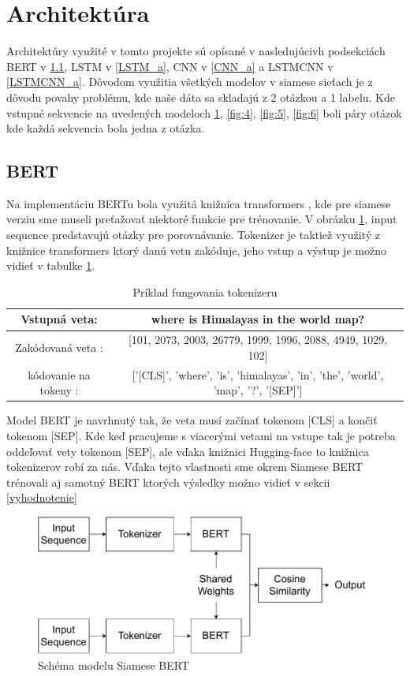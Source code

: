 \documentclass[a4paper, 16pt]{article}
\begin{document}
\section{Architektúra}
\label{architektura}

Architektúry využité v tomto projekte sú opísané v nasledujúcivh podsekciách BERT v \ref{BERT_a}, LSTM v \ref{LSTM_a}, CNN v \ref{CNN_a} a LSTMCNN v \ref{LSTMCNN_a}. Dôvodom využitia všetkých modelov v siamese sieťach je z dôvodu povahy problému, kde naše dáta sa skladajú z 2 otázkou a 1 labelu. Kde vstupné sekvencie na uvedených modeloch \ref{fig:3}, \ref{fig:4}, \ref{fig:5}, \ref{fig:6} boli páry otázok kde každá sekvencia bola jedna z otázka.

\subsection{BERT}
\label{BERT_a}
Na implementáciu BERTu bola využitá knižnica transformers \cite{transformers}, kde pre siamese verziu sme museli preťažovať niektoré funkcie pre trénovanie. V obrázku \ref{fig:3}, input sequence predstavujú otázky pre porovnávanie. Tokenizer je taktiež využitý z knižnice transformers ktorý danú vetu zakóduje, jeho vstup a výstup je možno vidieť v tabulke \ref{table:tokenizer}.

\begin{table}[H]
\centering
\begin{tabular}{ |c|c| } \hline
Vstupná veta: & where is Himalayas in the world map?\\ \hline
Zakódovaná veta : & [101, 2073, 2003, 26779, 1999, 1996, 2088, 4949, 1029, 102]\\ \hline
kódovanie na tokeny : & ['[CLS]', 'where', 'is', 'himalayas', 'in', 'the', 'world', 'map', '?', '[SEP]']\\ \hline
\end{tabular}
\caption{Príklad fungovania tokenizeru}
\label{table:tokenizer}
\end{table}

Model BERT je navrhnutý tak, že veta musí začínať tokenom [CLS] a končiť tokenom [SEP]. Kde keď pracujeme s viacerými vetami na vstupe tak je potreba oddeľovať vety tokenom [SEP], ale vďaka knižnici Hugging-face to knižnica tokenizerov robí za nás.
Vďaka tejto vlastnosti sme okrem Siamese BERT trénovali aj samotný BERT ktorých výsledky možno vidieť v sekcii \ref{vyhodnotenie}

\begin{figure}[H]
    \centering
    \includegraphics[width=15cm]{BERT.pdf}
    \caption{Schéma modelu Siamese BERT}
    \label{fig:3}
\end{figure}
\end{document}
